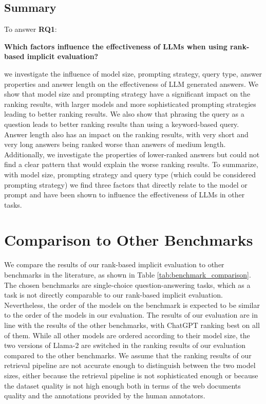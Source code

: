 \subsection{Summary}
To answer \textbf{RQ1}:
\begin{center}
    \textbf{Which factors influence the effectiveness of LLMs when using rank-based implicit evaluation?}
\end{center}
we investigate the influence of model size, prompting strategy, query type, answer properties and answer length on the effectiveness of LLM generated answers.
We show that model size and prompting strategy have a significant impact on the ranking results, with larger models and more sophisticated prompting strategies leading to better ranking results.
We also show that phrasing the query as a question leads to better ranking results than using a keyword-based query.
Answer length also has an impact on the ranking results, with very short and very long answers being ranked worse than answers of medium length.
Additionally, we investigate the properties of lower-ranked answers but could not find a clear pattern that would explain the worse ranking results.
To summarize, with model size, prompting strategy and query type (which could be considered prompting strategy) we find three factors that directly relate to the model or prompt and have been shown to influence the effectiveness of LLMs in other tasks.


\section{Comparison to Other Benchmarks}
We compare the results of our rank-based implicit evaluation to other benchmarks in the literature, as shown in Table \ref{tab:benchmark_comparison}.
The chosen benchmarks are single-choice question-answering tasks, which as a task is not directly comparable to our rank-based implicit evaluation.
Nevertheless, the order of the models on the benchmark is expected to be similar to the order of the models in our evaluation.
The results of our evaluation are in line with the results of the other benchmarks, with ChatGPT ranking best on all of them.
While all other models are ordered according to their model size, the two versions of Llama-2 are switched in the ranking results of our evaluation compared to the other benchmarks.
We assume that the ranking results of our retrieval pipeline are not accurate enough to distinguish between the two model sizes, either because the retrieval pipeline is not sophisticated enough or because the dataset quality is not high enough both in terms of the web documents quality and the annotations provided by the human annotators.

